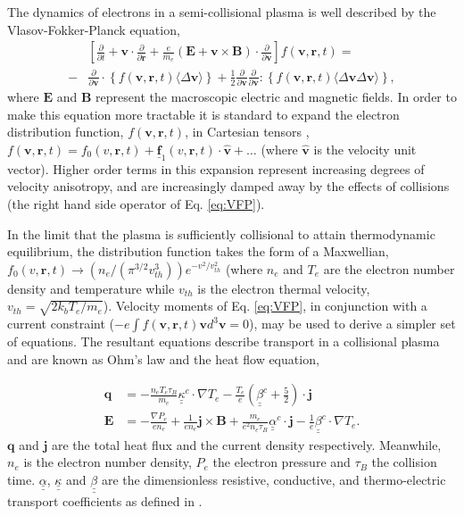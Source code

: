 \documentclass[aip,reprint]{revtex4-1}
\newcommand*{\dbul}[1]{%
	\underline{\underline{ #1}}
}
\newcommand*{\myvec}[1]{
	\mathbf{\underline{#1}}}
\begin{document}
The dynamics of electrons in a semi-collisional plasma is well described by the Vlasov-Fokker-Planck equation,
\begin{eqnarray}
&\left[\frac{\partial}{\partial t}+ \mathbf{v}\cdot \frac{\partial}{\partial \mathbf{r}} + \frac{e}{m_e}\left( \mathbf{E} +  \mathbf{v} \times  \mathbf{B} \right ) \cdot  \frac{\partial}{\partial \mathbf{v}} \right] f( \mathbf{v},\mathbf{r},t) =
\nonumber\\ 
-  &\frac{\partial}{\partial \mathbf{v}} \cdot \left\{ f( \mathbf{v},\mathbf{r},t) \langle \Delta \mathbf{v} \rangle \right\} + \frac{1}{2} \frac{\partial}{\partial \mathbf{v}} \frac{\partial}{\partial \mathbf{v}}:  \left\{ f( \mathbf{v},\mathbf{r},t) \langle \Delta \mathbf{v} \Delta \mathbf{v}\rangle \right\}, \label{eq:VFP}
\end{eqnarray}
where $\mathbf{E}$ and $\mathbf{B}$ represent the macroscopic electric and magnetic fields. In order to make  this equation more tractable it is standard to expand the electron distribution function, $f( \mathbf{v},\mathbf{r},t)$, in Cartesian tensors \cite{Shkarovsky1966}, $f(\mathbf{v},\mathbf{r},t) = f_0(v,\mathbf{r},t) + \myvec{f}_1(v,\mathbf{r},t) \cdot \hat{\mathbf{v}} + \dots$ (where $\hat{\mathbf{v}}$ is the velocity unit vector). Higher order terms in this expansion represent increasing degrees of velocity anisotropy, and are increasingly damped away by the effects of collisions (the right hand side operator of Eq. \ref{eq:VFP}). 


In the limit that the plasma is sufficiently collisional to attain thermodynamic equilibrium,  the distribution function takes the form of a Maxwellian, $f_0(v,\mathbf{r},t) \rightarrow (n_e/(\pi^{3/2} v_{th}^3))e^ {-v^2/v_{th}^2}$ (where $n_e$ and $T_e$ are the electron number density and temperature while $v_{th}$ is the  electron thermal velocity, $v_{th} = \sqrt{2 k_b T_e/m_e}$).  Velocity moments of Eq. \ref{eq:VFP}, in conjunction with a current constraint ($-e\int f(\mathbf{v},\mathbf{r},t) \mathbf{v} d^3 \mathbf{v} = 0$), may be used to derive a simpler set of equations. The resultant equations describe transport in a collisional plasma and are known as Ohm's law and the  heat flow equation,

\begin{eqnarray}
\mathbf{q} &= - \frac{n_e T_e \tau_B}{m_e}\dbul{\kappa}^c \cdot \nabla T_e - \frac{T_e}{e}\left(\dbul{\beta}^c + \frac{5}{2}\right) \cdot \mathbf{j} \\
 \mathbf{E} &= -\frac{\nabla P_e}{e n_e} + \frac{1}{en_e}\mathbf{j}\times \mathbf{B} + \frac{m_e}{e^2 n_e \tau_B}\dbul{\alpha}^c \cdot \mathbf{j} - \frac{1}{e} \dbul{\beta}^{c} \cdot \nabla T_e.
   \label{eq:transport}
\end{eqnarray}
$\mathbf{q}$ and $\mathbf{j}$ are the total heat flux  and the current density respectively. Meanwhile, $n_e$ is the electron number density, $P_e$ the electron pressure and $\tau_B$ the collision time. $\dbul{\alpha}$, $\dbul{\kappa}$ and $\dbul{\beta}$ are the dimensionless resistive, conductive, and thermo-electric transport coefficients as defined in \cite{Epperlein1986}.
\end{document}
